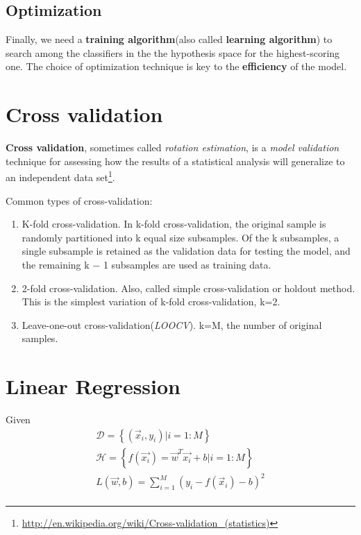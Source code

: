 \subsection{Optimization}
Finally, we need a \textbf{training algorithm}(also called \textbf{learning algorithm}) to search among the classifiers in the the hypothesis space for the highest-scoring one. The choice of optimization technique is key to the \textbf{efficiency} of the model.


\section{Cross validation}
\begin{definition}
\textbf{Cross validation}, sometimes called \emph{rotation estimation}, is a \emph{model validation} technique for assessing how the results of a statistical analysis will generalize to an independent data set\footnote{\url{http://en.wikipedia.org/wiki/Cross-validation_(statistics)}}.
\end{definition}

Common types of cross-validation:
\begin{enumerate}
\item K-fold cross-validation. In k-fold cross-validation, the original sample is randomly partitioned into k equal size subsamples. Of the k subsamples, a single subsample is retained as the validation data for testing the model, and the remaining k − 1 subsamples are used as training data.
\item 2-fold cross-validation. Also, called simple cross-validation or holdout method. This is the simplest variation of k-fold cross-validation, k=2.
\item Leave-one-out cross-validation(\emph{LOOCV}). k=M, the number of original samples.
\end{enumerate}

\section{Linear Regression}
Given 
\begin{equation}
\begin{array}{lcl}
\mathcal{D}=\left\{(\vec{x}_i,y_i) | i=1:M\right\} \\
\mathcal{H}=\left\{f(\vec{x_i})=\vec{w}^T\vec{x_i}+b | i=1:M\right\}\\
L(\vec{w},b)=\sum\limits_{i=1}^{M} \left(y_i-f(\vec{x}_i)-b\right)^2\\
\end{array}
\end{equation}

